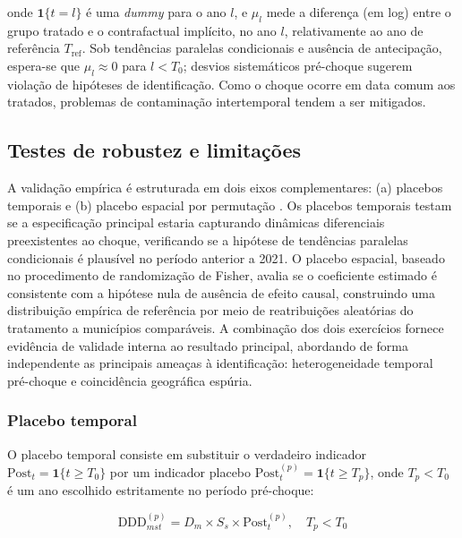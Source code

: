 \documentclass[12pt,a4paper]{article}
\begin{document}
onde $\mathbf{1}\{t = l\}$ \'e uma \textit{dummy} para o ano $l$, e $\mu_l$ mede a diferen\c{c}a (em log) entre o grupo tratado e o contrafactual impl\'icito, no ano $l$, relativamente ao ano de refer\^encia $T_{\text{ref}}$. Sob tend\^encias paralelas condicionais e aus\^encia de antecipa\c{c}\~ao, espera-se que $\mu_l \approx 0$ para $l < T_0$; desvios sistem\'aticos pr\'e-choque sugerem viola\c{c}\~ao de hip\'oteses de identifica\c{c}\~ao. Como o choque ocorre em data comum aos tratados, problemas de contamina\c{c}\~ao intertemporal \parencite{sun2021} tendem a ser mitigados.

\subsection{Testes de robustez e limita\c{c}\~oes}
\label{sub:robustez}

A valida\c{c}\~ao emp\'irica \'e estruturada em dois eixos complementares: (a) placebos temporais e (b) placebo espacial por permuta\c{c}\~ao \parencite{olden2022}. Os placebos temporais testam se a especifica\c{c}\~ao principal estaria capturando din\^amicas diferenciais preexistentes ao choque, verificando se a hip\'otese de tend\^encias paralelas condicionais \'e plaus\'ivel no per\'iodo anterior a 2021. O placebo espacial, baseado no procedimento de randomiza\c{c}\~ao de Fisher, avalia se o coeficiente estimado \'e consistente com a hip\'otese nula de aus\^encia de efeito causal, construindo uma distribui\c{c}\~ao emp\'irica de refer\^encia por meio de reatribui\c{c}\~oes aleat\'orias do tratamento a munic\'ipios compar\'aveis. A combina\c{c}\~ao dos dois exerc\'icios fornece evid\^encia de validade interna ao resultado principal, abordando de forma independente as principais amea\c{c}as \`a identifica\c{c}\~ao: heterogeneidade temporal pr\'e-choque e coincid\^encia geogr\'afica esp\'uria.

\subsubsection{Placebo temporal}
\label{sub:placebo_temporal}

O placebo temporal consiste em substituir o verdadeiro indicador $\text{Post}_t = \mathbf{1}\{t \geq T_0\}$ por um indicador placebo $\text{Post}_t^{(p)} = \mathbf{1}\{t \geq T_p\}$, onde $T_p < T_0$ \'e um ano escolhido estritamente no per\'iodo pr\'e-choque:

\begin{equation}
\text{DDD}_{mst}^{(p)} = D_m \times S_s \times \text{Post}_t^{(p)}, \quad T_p < T_0
\label{eq:placebo_temporal}
\end{equation}
\end{document}
